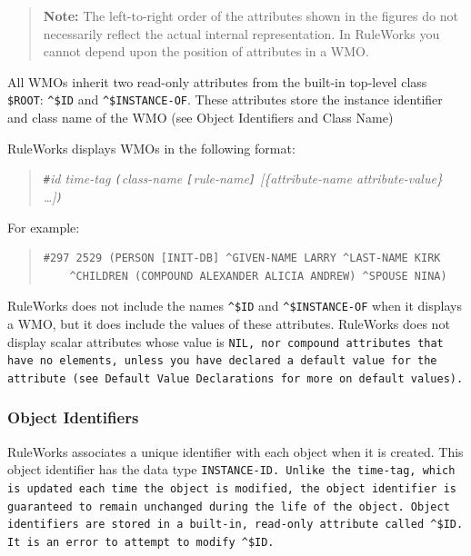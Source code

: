 \begin{quote}
  \textbf{Note:} The left-to-right order of the attributes shown in
  the figures do not necessarily reflect the actual internal
  representation. In RuleWorks you cannot depend upon the position of
  attributes in a WMO.
\end{quote}

All WMOs inherit two read-only attributes from the built-in
top-level class \verb|$ROOT|: \verb|^$ID| and \verb|^$INSTANCE-OF|. These
attributes store the instance identifier and class name of
the WMO (see Object Identifiers and Class Name)

RuleWorks displays WMOs in the following format:

\begin{quote}
  \verb|#|\it{id} \it{time-tag} \verb|(|\it{class-name}
  \verb|[|\it{rule-name}\verb|]| [\{\ct\it{attribute-name}
  \it{attribute-value}\} \ldots]\verb|)|
\end{quote}

For example:

\begin{quote}
\begin{verbatim}
#297 2529 (PERSON [INIT-DB] ^GIVEN-NAME LARRY ^LAST-NAME KIRK
    ^CHILDREN (COMPOUND ALEXANDER ALICIA ANDREW) ^SPOUSE NINA)
\end{verbatim}
\end{quote}

RuleWorks does not include the names \verb|^$ID| and \verb|^$INSTANCE-OF|
when it displays a WMO, but it does include the values of
these attributes. RuleWorks does not display scalar
attributes whose value is \tt{NIL}, nor compound attributes that
have no elements, unless you have declared a default value
for the attribute (see Default Value Declarations for more on
default values).

\subsubsection*{Object Identifiers}

RuleWorks associates a unique identifier with each object
when it is created. This object identifier has the data type
\tt{INSTANCE-ID}. Unlike the time-tag, which is updated each time
the object is modified, the object identifier is guaranteed
to remain unchanged during the life of the object. Object
identifiers are stored in a built-in, read-only attribute
called \verb|^$ID|. It is an error to attempt to modify \verb|^$ID|.


